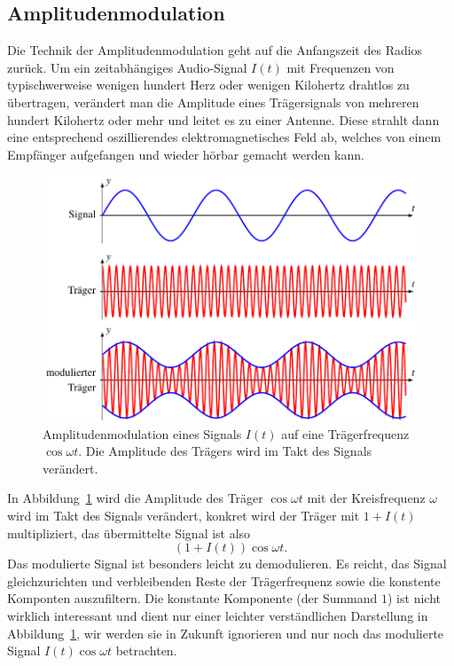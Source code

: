 %
%
%
\subsection{Amplitudenmodulation
\label{subsection:amplitudenmodulation}}
Die Technik der Amplitudenmodulation geht auf die Anfangszeit des
Radios zurück.
Um ein zeitabhängiges Audio-Signal $I(t)$ mit Frequenzen von typischwerweise
wenigen hundert Herz oder wenigen Kilohertz drahtlos zu übertragen,
verändert man die Amplitude eines Trägersignals von mehreren hundert
Kilohertz oder mehr und leitet es zu einer Antenne.
Diese strahlt dann eine entsprechend oszillierendes elektromagnetisches
Feld ab, welches von einem Empfänger aufgefangen und wieder hörbar gemacht
werden kann.

\begin{figure}
\centering
\includegraphics{applications/qam/am.pdf}
\caption{Amplitudenmodulation eines Signals $I(t)$ auf eine
Trägerfrequenz $\cos\omega t$.
Die Amplitude des Trägers wird im Takt des Signals verändert.
\label{figure:qam:am}}
\end{figure}

In Abbildung~\ref{figure:qam:am} wird die Amplitude des Träger
$\cos\omega t$ mit der Kreisfrequenz $\omega$ wird im Takt des
Signals verändert,
konkret wird der Träger mit $1+I(t)$ multipliziert,
das übermittelte Signal ist also
\begin{equation}
(1+I(t)) \cos\omega t.
\end{equation}
Das modulierte Signal ist besonders leicht zu demodulieren.
Es reicht, das Signal gleichzurichten und verbleibenden Reste
der Trägerfrequenz sowie die konstente Komponten auszufiltern.
Die konstante Komponente (der Summand $1$) ist nicht wirklich
interessant und dient nur einer leichter verständlichen Darstellung
in Abbildung~\ref{figure:qam:am}, wir werden sie in Zukunft 
ignorieren und nur noch das modulierte Signal $I(t)\cos\omega t$
betrachten.

